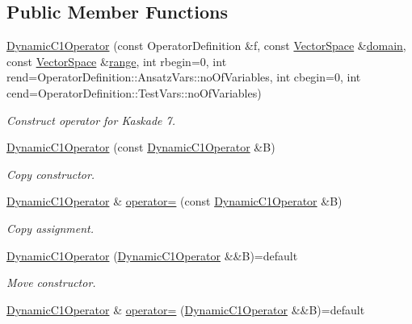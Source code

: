 \subsection*{Public Member Functions}
\begin{DoxyCompactItemize}
\item 
\hyperlink{classSpacy_1_1Kaskade_1_1DynamicC1Operator_a5b9e778e72f9e8039efcfca2a5776528}{Dynamic\-C1\-Operator} (const Operator\-Definition \&f, const \hyperlink{classSpacy_1_1VectorSpace}{Vector\-Space} \&\hyperlink{classSpacy_1_1OperatorBase_a2588f9b3e0188820c4c494e63293dc6f}{domain}, const \hyperlink{classSpacy_1_1VectorSpace}{Vector\-Space} \&\hyperlink{classSpacy_1_1OperatorBase_ab19d3b7a6f290b1079248f1e567e53d6}{range}, int rbegin=0, int rend=Operator\-Definition\-::\-Ansatz\-Vars\-::no\-Of\-Variables, int cbegin=0, int cend=Operator\-Definition\-::\-Test\-Vars\-::no\-Of\-Variables)
\begin{DoxyCompactList}\small\item\em Construct operator for Kaskade 7. \end{DoxyCompactList}\item 
\hyperlink{classSpacy_1_1Kaskade_1_1DynamicC1Operator_ac0d968516e017aa8e46f33273ee715b4}{Dynamic\-C1\-Operator} (const \hyperlink{classSpacy_1_1Kaskade_1_1DynamicC1Operator}{Dynamic\-C1\-Operator} \&B)
\begin{DoxyCompactList}\small\item\em Copy constructor. \end{DoxyCompactList}\item 
\hyperlink{classSpacy_1_1Kaskade_1_1DynamicC1Operator}{Dynamic\-C1\-Operator} \& \hyperlink{classSpacy_1_1Kaskade_1_1DynamicC1Operator_aa096a4b6941e19a9855eb1b2fa8ab156}{operator=} (const \hyperlink{classSpacy_1_1Kaskade_1_1DynamicC1Operator}{Dynamic\-C1\-Operator} \&B)
\begin{DoxyCompactList}\small\item\em Copy assignment. \end{DoxyCompactList}\item 
\hyperlink{classSpacy_1_1Kaskade_1_1DynamicC1Operator_a7e946ceb59cd4c4ab283a0ac55312eee}{Dynamic\-C1\-Operator} (\hyperlink{classSpacy_1_1Kaskade_1_1DynamicC1Operator}{Dynamic\-C1\-Operator} \&\&B)=default
\begin{DoxyCompactList}\small\item\em Move constructor. \end{DoxyCompactList}\item 
\hyperlink{classSpacy_1_1Kaskade_1_1DynamicC1Operator}{Dynamic\-C1\-Operator} \& \hyperlink{classSpacy_1_1Kaskade_1_1DynamicC1Operator_ad7259427c3acfdccd8dc8e5c644ed8ea}{operator=} (\hyperlink{classSpacy_1_1Kaskade_1_1DynamicC1Operator}{Dynamic\-C1\-Operator} \&\&B)=default

\end{DoxyCompactItemize}
